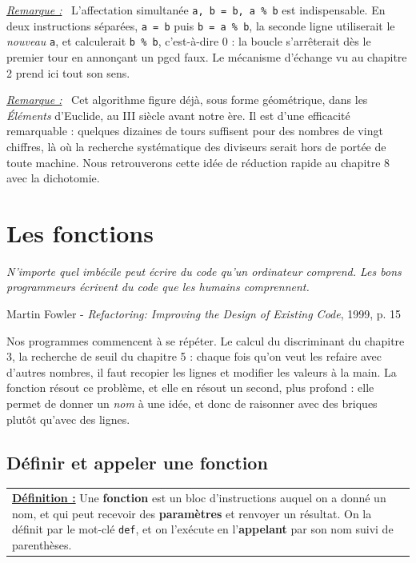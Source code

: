 \documentclass[a4paper,11pt,openany]{book}
\newcommand{\mot}[1]{\textcolor{rougecours}{\textbf{#1}}}
\newcommand{\code}[1]{\texttt{\textcolor{codebleu}{#1}}}
\newenvironment{remarque}%
 {\par\vspace{1mm}\begin{list}{}{\leftmargin=1cm \rightmargin=0.5cm}\item[]%
  \textit{\underline{Remarque :}}~}%
 {\end{list}\vspace{1mm}}
\newcommand{\epigraphe}[2]{%
  \begin{list}{}{\leftmargin=1cm \rightmargin=1cm}\item[]
  \small\textit{#1}
  \end{list}
  \nopagebreak
  \hfill\small #2 \par\vspace{4mm}}
\begin{document}
\begin{remarque}
L'affectation simultanée \code{a, b = b, a \% b} est indispensable. En deux instructions séparées, \code{a = b} puis \code{b = a \% b}, la seconde ligne utiliserait le \emph{nouveau} \code{a}, et calculerait \code{b \% b}, c'est-à-dire $0$ : la boucle s'arrêterait dès le premier tour en annonçant un pgcd faux. Le mécanisme d'échange vu au chapitre 2 prend ici tout son sens.
\end{remarque}

\begin{remarque}
Cet algorithme figure déjà, sous forme géométrique, dans les \emph{Éléments} d'Euclide, au III siècle avant notre ère. Il est d'une efficacité remarquable : quelques dizaines de tours suffisent pour des nombres de vingt chiffres, là où la recherche systématique des diviseurs serait hors de portée de toute machine. Nous retrouverons cette idée de réduction rapide au chapitre 8 avec la dichotomie.
\end{remarque}
\chapter{Les fonctions}

\epigraphe{N'importe quel imbécile peut écrire du code qu'un ordinateur comprend. Les bons programmeurs écrivent du code que les humains comprennent.}{Martin Fowler - \emph{Refactoring: Improving the Design of Existing Code}, 1999, p. 15}

Nos programmes commencent à se répéter. Le calcul du discriminant du chapitre 3, la recherche de seuil du chapitre 5 : chaque fois qu'on veut les refaire avec d'autres nombres, il faut recopier les lignes et modifier les valeurs à la main. La fonction résout ce problème, et elle en résout un second, plus profond : elle permet de donner un \emph{nom} à une idée, et donc de raisonner avec des briques plutôt qu'avec des lignes.

\section{Définir et appeler une fonction}

\begin{center}
\begin{tabularx}{15cm}{||X}
\noindent \textbf{\underline{Définition :}} Une \mot{fonction} est un bloc d'instructions auquel on a donné un nom, et qui peut recevoir des \mot{paramètres} et renvoyer un résultat. On la définit par le mot-clé \code{def}, et on l'exécute en l'\mot{appelant} par son nom suivi de parenthèses.
\end{tabularx}
\end{center}
\end{document}

